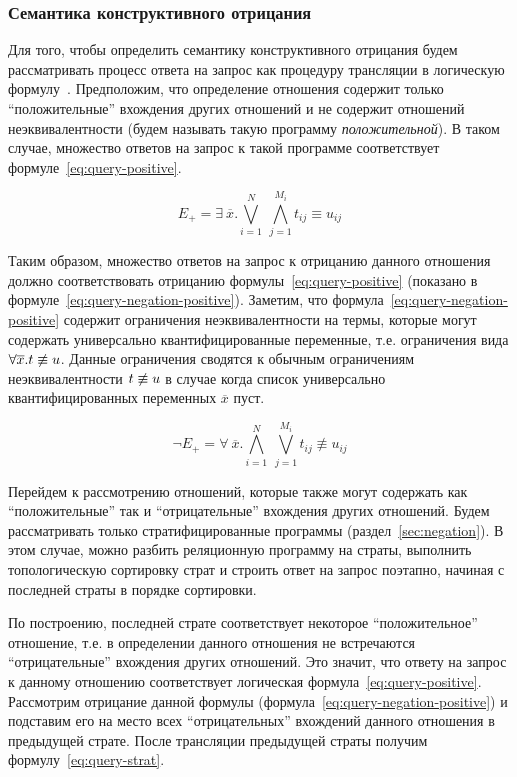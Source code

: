 \subsubsection{Семантика конструктивного отрицания}

\label{sec:negation-semantics}

Для того, чтобы определить семантику конструктивного отрицания
будем рассматривать процесс ответа на запрос как процедуру трансляции
в логическую формулу~\cite{przymusinski1989constructive}.
Предположим, что определение отношения содержит только ``положительные'' 
вхождения других отношений и не содержит отношений неэквивалентности 
(будем называть такую программу \emph{положительной}).
В таком случае, множество ответов на запрос к такой программе 
соответствует формуле~\ref{eq:query-positive}.

\begin{equation}
E_{+} = \exists~\overline{x}.\bigvee_{i=1}^{N}~\bigwedge_{j=1}^{M_i}{t_{ij} \equiv u_{ij}}
\label{eq:query-positive}
\end{equation}

Таким образом, множество ответов на запрос к отрицанию данного отношения 
должно соответствовать отрицанию формулы~\ref{eq:query-positive} 
(показано в формуле~\ref{eq:query-negation-positive}).
Заметим, что формула~\ref{eq:query-negation-positive} содержит 
ограничения неэквивалентности на термы, 
которые могут содержать универсально квантифицированные переменные,
т.е. ограничения вида ${\forall{\overline{x}}. t \not\equiv u}$.
Данные ограничения сводятся к обычным ограничениям неэквивалентности 
$t \not\equiv u$ в случае когда список 
универсально квантифицированных переменных $\overline{x}$ пуст.

\begin{equation}
\neg E_{+} = 
  \forall~\overline{x}.\bigwedge_{i=1}^{N}~\bigvee_{j=1}^{M_i}{t_{ij} \not\equiv u_{ij}}
\label{eq:query-negation-positive}
\end{equation}

Перейдем к рассмотрению отношений, которые также могут содержать как 
``положительные'' так и ``отрицательные'' вхождения других отношений.
Будем рассматривать только стратифицированные программы (раздел~\ref{sec:negation}).
В этом случае, можно разбить реляционную программу на страты,
выполнить топологическую сортировку страт и 
строить ответ на запрос поэтапно, начиная с последней страты в порядке сортировки.

По построению, последней страте соответствует некоторое ``положительное'' отношение,
т.е. в определении данного отношения не встречаются ``отрицательные'' вхождения других отношений. 
Это значит, что ответу на запрос к данному отношению соответствует 
логическая формула~\ref{eq:query-positive}.
Рассмотрим отрицание данной формулы (формула~\ref{eq:query-negation-positive}) 
и подставим его на место всех ``отрицательных'' вхождений
данного отношения в предыдущей страте.
После трансляции предыдущей страты получим формулу~\ref{eq:query-strat}.

